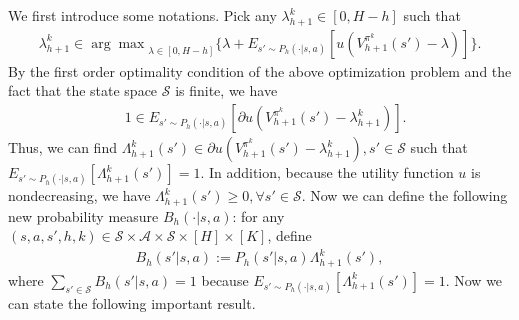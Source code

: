 \documentclass[11pt]{article}
\newcommand{\1}{\mathbbm{1}}
\begin{document}
We first introduce some notations. 
Pick any $\lambda_{h+1}^k \in [0,H-h]$ such that
\begin{align}\label{eq:opt-lambda2}
   \lambda_{h+1}^k \in {\arg \max}_{\lambda\in [0,H-h]}\{\lambda+E_{s'\sim P_h(\cdot\vert s,a)}[u(V_{h+1}^{\pi^k}(s')-\lambda)]\}.
\end{align}
By the first order optimality condition of the above optimization problem and the fact that the state space $\mathcal{S}$ is finite, we have 
\begin{align}\label{S222}
&1\in E_{s'\sim P_{h}(\cdot\vert s,a)}[\partial u(V_{h+1}^{\pi^k}(s')-\lambda_{h+1}^k)].
\end{align}
Thus, we can find $\Lambda^k_{h+1}(s')\in\partial u(V_{h+1}^{\pi^k}(s')-\lambda_{h+1}^k), s'\in\mathcal{S}$ such that $E_{s'\sim P_h(\cdot\vert s,a)}\left[\Lambda_{h+1}^k(s')\right]=1$. In addition, because the utility function $u$ is nondecreasing, we have $\Lambda_{h+1}^k(s')\geq 0,\forall s'\in\mathcal{S}$.
Now we can define the following new probability measure $B_h(\cdot\vert s,a)$: for any $(s,a,s',h,k)\in \mathcal{S}\times \mathcal{A}\times\mathcal{S}\times [H]\times [K]$, define
\begin{equation}\label{EQ17}
\begin{aligned}
B_{h}(s'\vert s,a) :=P_{h}(s'\vert s,a)\Lambda^k_{h+1}(s'),
\end{aligned}
\end{equation}
where $\sum_{s'\in\mathcal{S}}B_h(s'\vert s,a)=1$ because $E_{s'\sim P_h(\cdot\vert s,a)}\left[\Lambda_{h+1}^k(s')\right]=1$. Now we can state the following important result. 


\end{document}
